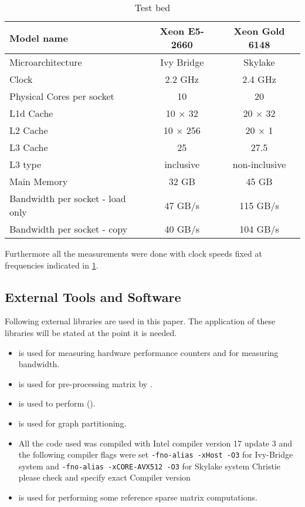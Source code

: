 \begin{table}[tbhp]
	\footnotesize
	\caption{Test bed}\label{tab:test_bed}
	\begin{center}
		\begin{tabular}{|l| c  c |}
			\toprule
			{Model name} & {Xeon\textsuperscript{\textregistered} E5-2660} & {Xeon\textsuperscript{\textregistered} Gold 6148} \\
			\midrule
			{Microarchitecture} & {Ivy Bridge} & {Skylake} \\
			\midrule
			{Clock} & {2.2 GHz} & {2.4 GHz}\\
			{Physical Cores per socket} & {10} & {20} \\
			{L1d Cache} & {10 $\times$ 32 \KB} & {20 $\times$ 32 \KB}\\
			{L2 Cache} & {10 $\times$ 256 \KB} & {20 $\times$ 1 \MB} \\
			{L3 Cache} & {25 \MB} & {27.5 \MB}\\
			{L3 type} & {inclusive} & {non-inclusive}\\
			{Main Memory} & {32 GB} & {45 GB}\\
			{Bandwidth per socket - load only} & {47 GB/s} & {115 GB/s}\\ %
			{Bandwidth per socket - copy} & {40 GB/s} & {104 GB/s}\\
			\bottomrule
		\end{tabular}
	\end{center}
\end{table} 

Furthermore all the measurements were done with  \CPU clock speeds fixed at frequencies indicated in \cref{tab:test_bed}.


\subsection{External Tools and Software}
Following external libraries are used in this paper. The application of these libraries will be stated at the point it is needed.
\begin{itemize}
	\item \LIKWID \cite{LIKWID}  is used for measuring hardware performance counters and   for measuring bandwidth.
	\item \COLPACK \cite{COLPACK} is used for pre-processing matrix by \MCfull.
	\item \SPMP \cite{SpMP} is used to perform \RCMfull (\RCM).
	\item \METIS\cite{METIS} is used for graph partitioning.
	\item All the code used was compiled with Intel compiler version 17 update 3 and the following compiler flags were set {\tt -fno-alias -xHost -O3} for Ivy-Bridge system and {\tt -fno-alias -xCORE-AVX512 -O3} for Skylake system {\GW Christie please check and specify exact Compiler version}
	\item \MKL \cite{MKL} is used for performing some reference sparse matrix computations.
\end{itemize}

